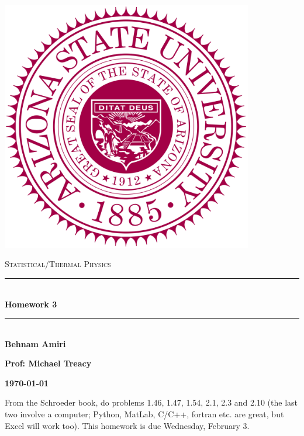 \documentclass[fleqn]{article}
\begin{document}
  \begin{titlepage}

    \newcommand{\HRule}{\rule{\linewidth}{0.5mm}}

    \center

    \begin{center}
      \includegraphics[height=11cm, width=11cm]{asu.png}
    \end{center}

    \vline

    \textsc{\LARGE Statistical/Thermal Physics}\\[1.5cm]

    \HRule \\[0.5cm]
    { \huge \bfseries Homework 3}\\[0.4cm] 
    \HRule \\[1.0cm]

    \textbf{Behnam Amiri}

    \bigbreak

    \textbf{Prof: Michael Treacy}

    \bigbreak

    \textbf{{\large \today}\\[2cm]}

    \vfill

  \end{titlepage}

  From the Schroeder book, do problems 1.46, 1.47, 1.54, 2.1, 2.3 and 2.10 
  (the last two involve a computer; Python, MatLab, C/C++, fortran etc. are great, 
  but Excel will work too). This homework is due Wednesday, February 3.
\end{document}
